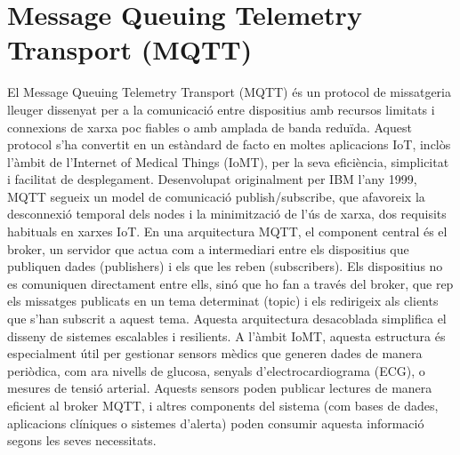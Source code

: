   \section{Message Queuing Telemetry Transport (MQTT)}
  El Message Queuing Telemetry Transport (MQTT) és un protocol de missatgeria lleuger dissenyat per a la comunicació entre dispositius amb recursos limitats i connexions de xarxa poc fiables o amb amplada de banda reduïda. Aquest protocol s’ha convertit en un estàndard de facto en moltes aplicacions IoT, inclòs l’àmbit de l’Internet of Medical Things (IoMT), per la seva eficiència, simplicitat i facilitat de desplegament. Desenvolupat originalment per IBM l’any 1999, MQTT segueix un model de comunicació publish/subscribe, que afavoreix la desconnexió temporal dels nodes i la minimització de l’ús de xarxa, dos requisits habituals en xarxes IoT.
  En una arquitectura MQTT, el component central és el broker, un servidor que actua com a intermediari entre els dispositius que publiquen dades (publishers) i els que les reben (subscribers). Els dispositius no es comuniquen directament entre ells, sinó que ho fan a través del broker, que rep els missatges publicats en un tema determinat (topic) i els redirigeix als clients que s’han subscrit a aquest tema. Aquesta arquitectura desacoblada simplifica el disseny de sistemes escalables i resilients.
  A l’àmbit IoMT, aquesta estructura és especialment útil per gestionar sensors mèdics que generen dades de manera periòdica, com ara nivells de glucosa, senyals d’electrocardiograma (ECG), o mesures de tensió arterial. Aquests sensors poden publicar lectures de manera eficient al broker MQTT, i altres components del sistema (com bases de dades, aplicacions clíniques o sistemes d’alerta) poden consumir aquesta informació segons les seves necessitats.
  
